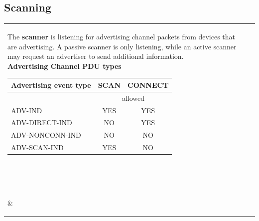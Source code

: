 	\subsection{Scanning}
		\begin{tabular}{ll}
			\parbox{9cm}{
				The \textbf{scanner} is listening for advertising channel packets from devices that are advertising. A passive 
				scanner is only listening, while an active scanner may request an advertiser to send additional information. \\
				
				\textbf{Advertising Channel PDU types} \\
				\begin{tabular}{|l|c|c|}
					\hline \textbf{Advertising event type} & \textbf{SCAN} & \textbf{CONNECT} \\ 
					\hline & \multicolumn{2}{|c|}{allowed} \\
					\hline ADV-IND & YES & YES \\ 
					\hline ADV-DIRECT-IND & NO & YES \\ 
					\hline ADV-NONCONN-IND & NO & NO \\ 
					\hline ADV-SCAN-IND & YES & NO \\ 
					\hline 
				\end{tabular} \\ \\ \\
			}
			& \parbox{9cm}{
			}
		\end{tabular}	
			